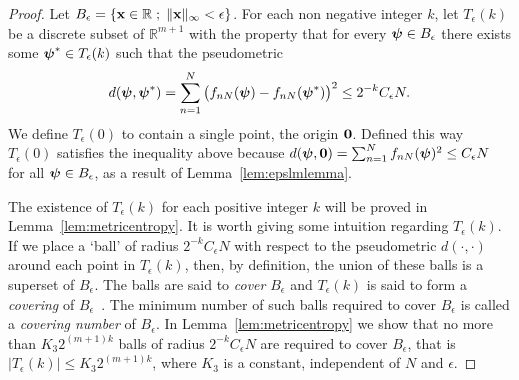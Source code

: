 \documentclass[aap]{imsart}
\newcommand{\reals}{{\mathbb R}}
\newcommand{\expect}{{\mathbb E}}
\renewcommand{\mid}{\; ; \;}
\newcommand{\abs}[1]{\left\vert #1 \right\vert}
\begin{document}
\begin{proof}  Let $B_\epsilon = \{\xbf \in \reals \mid \|\xbf\|_\infty < \epsilon \}$.
For each non negative integer $k$, let $T_\epsilon(k)$ be a discrete subset of $\reals^{m+1}$ with the property that for every $\boldsymbol{\psi} \in B_\epsilon$ there exists some $\boldsymbol{\psi}^* \in T_\epsilon(k)$ such that the pseudometric
\[
d(\boldsymbol{\psi}, \boldsymbol{\psi}^*) = \sum_{n = 1}^N \big( f_{nN}(\boldsymbol{\psi}) - f_{nN}(\boldsymbol{\psi}^*) \big)^2 \leq 2^{-k} C_\epsilon N.
\]
We define $T_\epsilon(0)$ to contain a single point, the origin $\boldsymbol{0}$.  Defined this way $T_\epsilon(0)$ satisfies the inequality above because $d(\boldsymbol{\psi}, \boldsymbol{0}) = \sum_{n = 1}^N f_{nN}(\boldsymbol{\psi})^2  \leq C_\epsilon N$ for all $\boldsymbol{\psi} \in B_\epsilon$, as a result of Lemma~\ref{lem:epslmlemma}.

The existence of $T_\epsilon(k)$ for each positive integer $k$ will be proved in Lemma~\ref{lem:metricentropy}.  It is worth giving some intuition regarding $T_\epsilon(k)$.  If we place a `ball' of radius $2^{-k} C_\epsilon N$  with respect to the pseudometric $d(\cdot, \cdot)$ around each point in $T_\epsilon(k)$, then, by definition, the union of these balls is a superset of $B_\epsilon$.  The balls are said to \emph{cover} $B_\epsilon$ and $T_\epsilon(k)$ is said to form a \emph{covering} of $B_\epsilon$~\cite[Section 1.2]{Dudley_unif_central_lim_th_1999}.  The minimum number of such balls required to cover $B_\epsilon$ is called a \emph{covering number} of $B_\epsilon$.  In Lemma~\ref{lem:metricentropy} we show that no more than $K_3 2^{(m+1)k}$ balls of radius $2^{-k} C_\epsilon N$ are required to cover $B_\epsilon$, that is $\abs{T_\epsilon(k)} \leq K_3 2^{(m+1)k}$, where $K_3$ is a constant, independent of $N$ and $\epsilon$.  %


\end{proof}
\end{document}
